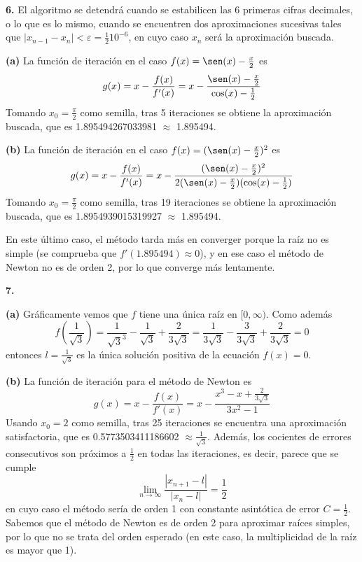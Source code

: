 \documentclass[12pt]{report}
\begin{document}
\vspace{6mm}
\textbf{6. } El algoritmo se detendrá cuando se estabilicen las 6 primeras cifras decimales, o lo que es lo mismo, cuando se encuentren dos aproximaciones sucesivas tales que $|x_{n-1} - x_n| < \varepsilon = \frac{1}{2}10^{-6}$, en cuyo caso $x_n$ será la aproximación buscada.

\vspace{2mm}
\textbf{(a) } La función de iteración en el caso $f(x) = \sen(x)-\frac{x}{2}$ es
\[g(x) = x - \frac{f(x)}{f'(x)} = x - \frac{\sen(x)-\frac{x}{2}}{\cos(x) - \frac{1}{2}}\]
Tomando $x_0 = \frac{\pi}{2}$ como semilla, tras 5 iteraciones se obtiene la aproximación buscada, que es 1.895494267033981 $\approx$ 1.895494.

\vspace{2mm}
\textbf{(b) } La función de iteración en el caso $f(x) = (\sen(x)-\frac{x}{2})^2$ es
\[g(x) = x - \frac{f(x)}{f'(x)} = x - \frac{(\sen(x)-\frac{x}{2})^2}{2(\sen(x)-\frac{x}{2})(\cos(x) - \frac{1}{2})}\]
Tomando $x_0 = \frac{\pi}{2}$ como semilla, tras 19 iteraciones se obtiene la aproximación buscada, que es 1.8954939015319927 $\approx$ 1.895494.

\vspace{2mm}
En este último caso, el método tarda más en converger porque la raíz no es simple (se comprueba que $f'(1.895494) \approx 0$), y en ese caso el método de Newton no es de orden 2, por lo que converge más lentamente.

\vspace{6mm}
\textbf{7. } 

\vspace{2mm}
\textbf{(a) } Gráficamente vemos que $f$ tiene una única raíz en $[0,\infty)$. Como además
\[f(\frac{1}{\sqrt{3}}) = \frac{1}{\sqrt{3}^3}-\frac{1}{\sqrt{3}}+\frac{2}{3\sqrt{3}} = \frac{1}{3\sqrt{3}}-\frac{3}{3\sqrt{3}}+\frac{2}{3\sqrt{3}} = 0\]
entonces $l = \frac{1}{\sqrt{3}}$ es la única solución positiva de la ecuación $f(x)=0$.

\vspace{2mm}
\textbf{(b) } La función de iteración para el método de Newton es
\[g(x) = x - \frac{f(x)}{f'(x)} = x - \frac{x^3-x+\frac{2}{3\sqrt{3}}}{3x^2-1}\]
Usando $x_0 = 2$ como semilla, tras 25 iteraciones se encuentra una aproximación satisfactoria, que es 0.5773503411186602 $\approx \frac{1}{\sqrt{3}}$. Además, los cocientes de errores consecutivos son próximos a $\frac{1}{2}$ en todas las iteraciones, es decir, parece que se cumple
\[\lim_{n \to \infty} \frac{|x_{n+1}-l|}{|x_n-l|} = \frac{1}{2}\]
en cuyo caso el método sería de orden 1 con constante asintótica de error $C = \frac{1}{2}$. Sabemos que el método de Newton es de orden 2 para aproximar raíces simples, por lo que no se trata del orden esperado (en este caso, la multiplicidad de la raíz es mayor que 1).
\end{document}
